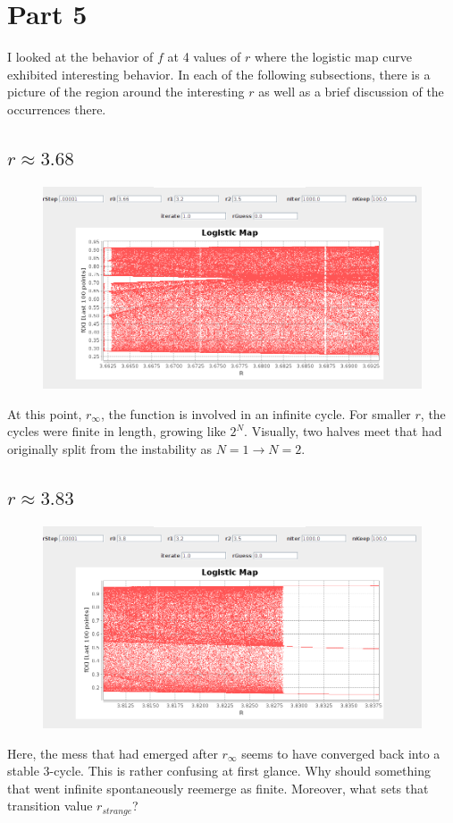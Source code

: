 \documentclass[aps,letterpaper,10pt]{article}
\begin{document}
\newpage
\section{Part 5}

I looked at the behavior of $f$ at 4 values of $r$ where the logistic map curve exhibited interesting behavior. In each of the following subsections, there is a picture of the region around the interesting $r$ as well as a brief discussion of the occurrences there.\\

\subsection{$r\approx3.68$}
\begin{figure}[!h]
\centering
\includegraphics[width=\textwidth]{../pictures/CoolPic1.png}
\label{fig:r1}
\end{figure}

At this point, $r_\infty$, the function is involved in an infinite cycle. For smaller $r$, the cycles were finite in length, growing like $2^N$. Visually, two halves meet that had originally split from the instability as $N=1\to N=2$.

\subsection{$r\approx3.83$}
\begin{figure}[!h]
\centering
\includegraphics[width=\textwidth]{../pictures/CoolPic2.png}
\label{fig:r2}
\end{figure}
Here, the mess that had emerged after $r_\infty$ seems to have converged back into a stable 3-cycle. This is rather confusing at first glance. Why should something that went infinite spontaneously reemerge as finite. Moreover, what sets that transition value $r_{strange}$?
\end{document}
